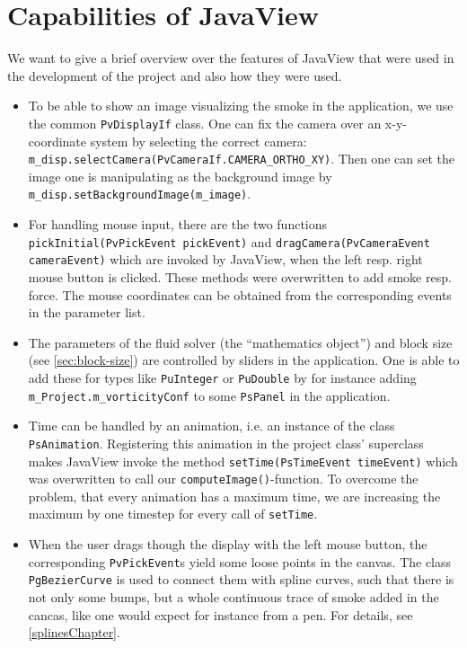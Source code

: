\documentclass[a4paper,10pt,oneside,final,german,openbib,pdftex,titlepage]{scrbook}
\begin{document}
\section{Capabilities of JavaView}
We want to give a brief overview over the features of JavaView that were used in the development of the project and also how they were used.
\begin{itemize}
\item To be able to show an image visualizing the smoke in the application, we use the common \texttt{PvDisplayIf} class. One can fix the camera over an x-y-coordinate system by selecting the correct camera: \texttt{m\_disp.selectCamera(PvCameraIf.CAMERA\_ORTHO\_XY)}. Then one can set the image one is manipulating as the background image by \texttt{m\_disp.setBackgroundImage(m\_image)}.
\item For handling mouse input, there are the two functions \texttt{pickInitial(PvPickEvent pickEvent)} and \texttt{dragCamera(PvCameraEvent cameraEvent)} which are invoked by JavaView, when the left resp. right mouse button is clicked. These methods were overwritten to add smoke resp. force. The mouse coordinates can be obtained from the corresponding events in the parameter list.
\item The parameters of the fluid solver (the ``mathematics object'') and block size (see \ref{sec:block-size}) are controlled by sliders in the application. One is able to add these for types like \texttt{PuInteger} or \texttt{PuDouble} by for instance adding \texttt{m\_Project.m\_vorticityConf} to some \texttt{PsPanel} in the application.
\item Time can be handled by an animation, i.e. an instance of the class \texttt{PsAnimation}. Registering this animation in the project class' superclass makes JavaView invoke the method \texttt{setTime(PsTimeEvent timeEvent)} which was overwritten to call our \texttt{computeImage()}-function. To overcome the problem, that every animation has a maximum time, we are increasing the maximum by one timestep for every call of \texttt{setTime}.
\item When the user drags though the display with the left mouse button, the corresponding \texttt{PvPickEvent}s yield some loose points in the canvas. The class \texttt{PgBezierCurve} is used to connect them with spline curves, such that there is not only some bumps, but a whole continuous trace of smoke added in the cancas, like one would expect for instance from a pen. For details, see \ref{splinesChapter}.
\end{itemize}
%
\end{document}
